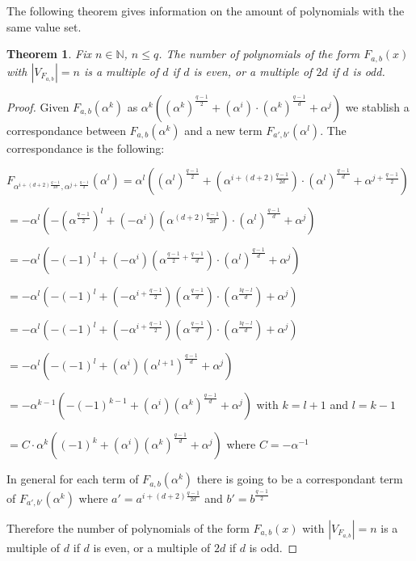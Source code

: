 \documentclass{article}
\newtheorem{theorem}{Theorem}[section]
\theoremstyle{definition}
\theoremstyle{remark}
\numberwithin{equation}{section}
\begin{document}
 The following theorem gives information on the amount of polynomials with the same value set.

    \begin{theorem}\label{el_teorema}
        Fix $n \in \mathbb{N}$, $n \leq q$. The number of polynomials of the form $F_{a,b}(x)$ with $\left\vert V_{F_{a,b}} \right\vert = n$ is a multiple of $d$ if $d$ is even, or a multiple of $2d$ if $d$ is odd.
    \end{theorem}

    \begin{proof}
      Given $F_{a,b}(\alpha^{k})$ as $\alpha^k((\alpha^k)^{\frac{q-1}{2}}+(\alpha^{i})\cdot(\alpha^k)^{\frac{q-1}{d}}+\alpha^{j})$ we stablish a correspondance between $F_{a,b}(\alpha^{k})$ and a new term $F_{a',b'}(\alpha^{l})$. The correspondance is the following:

      $F_{\alpha^{i+(d+2)\frac{q-1}{2d}},\alpha^{j+\frac{q-1}{2}}}(\alpha^{l}) = \alpha^l((\alpha^l)^{\frac{q-1}{2}}+(\alpha^{i+(d+2)\frac{q-1}{2d}})\cdot(\alpha^l)^{\frac{q-1}{d}}+\alpha^{j+\frac{q-1}{2}})$

      $= -\alpha^l(-(\alpha^{\frac{q-1}{2}})^l+(-\alpha^{i})(\alpha^{(d+2)\frac{q-1}{2d}})\cdot(\alpha^l)^{\frac{q-1}{d}}+\alpha^{j})$

      $= -\alpha^l(-(-1)^{l}+(-\alpha^{i})(\alpha^{\frac{q-1}{2}+\frac{q-1}{d}})\cdot(\alpha^l)^{\frac{q-1}{d}}+\alpha^{j})$

      $= -\alpha^l(-(-1)^{l}+(-\alpha^{i+\frac{q-1}{2}})(\alpha^{\frac{q-1}{d}})\cdot(\alpha^{\frac{lq-l}{d}})+\alpha^{j})$

      $= -\alpha^l(-(-1)^{l}+(-\alpha^{i+\frac{q-1}{2}})(\alpha^{\frac{q-1}{d}})\cdot(\alpha^{\frac{lq-l}{d}})+\alpha^{j})$

      $= -\alpha^l(-(-1)^{l}+(\alpha^{i})(\alpha^{l+1})^{\frac{q-1}{d}}+\alpha^{j})$

      $= -\alpha^{k-1}(-(-1)^{k-1}+(\alpha^{i})(\alpha^{k})^{\frac{q-1}{d}}+\alpha^{j})$ with $k=l+1$ and $l=k-1$

      $= C \cdot \alpha^{k}((-1)^{k}+(\alpha^{i})(\alpha^{k})^{\frac{q-1}{d}}+\alpha^{j})$ where $C=-\alpha^{-1}$

      In general for each term of $F_{a,b}(\alpha^{k})$ there is going to be a correspondant term of $F_{a',b'}(\alpha^{k})$ where $a' = a^{i+(d+2)\frac{q-1}{2d}}$ and $b'= b^{\frac{q-1}{2}}$

      Therefore the number of polynomials of the form $F_{a,b}(x)$ with $\left\vert V_{F_{a,b}} \right\vert = n$ is a multiple of $d$ if $d$ is even, or a multiple of $2d$ if $d$ is odd.
    \end{proof}
\end{document}
